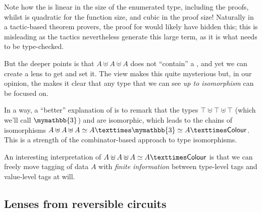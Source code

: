 \documentclass[sigplan,review,anonymous]{acmart}
\begin{document}
Note how the  is linear in the size of the enumerated type, including
the proofs, whilst  is quadratic for the function size, and cubic in
the proof size!  Naturally in a tactic-based theorem provers, the proof for
 would likely have hidden this; this is misleading as the tactics
nevertheless generate this large term, as it is what needs to be type-checked.

But the deeper points is that $A ⊎ A ⊎ A$ does not ``contain'' a ,
and yet we can create a lens to get and set it.  The  view makes this
quite mysterious but, in our opinion, the  makes it clear that any
type that we can see \emph{up to isomorphism} can be focused on.

In a way, a ``better'' explanation of 
is to remark that the types $⊤ ⊎ ⊤ ⊎ ⊤$ (which we'll call
$\mymathbb{3}$) and  are isomorphic, which leads to
the chains of isomorphisms $A \uplus A \uplus A \simeq A × \mymathbb{3}
\simeq A × \AgdaRecord{Colour}$. This is a strength of the combinator-based
approach to type isomorphisms.

An interesting interpretation of $A \uplus A \uplus A \simeq A × \AgdaRecord{Colour}$
is that we can freely move tagging
of data $A$ with \textit{finite information} between type-level tags and value-level
tags at will.

\subsection{Lenses from reversible circuits}
\end{document}
